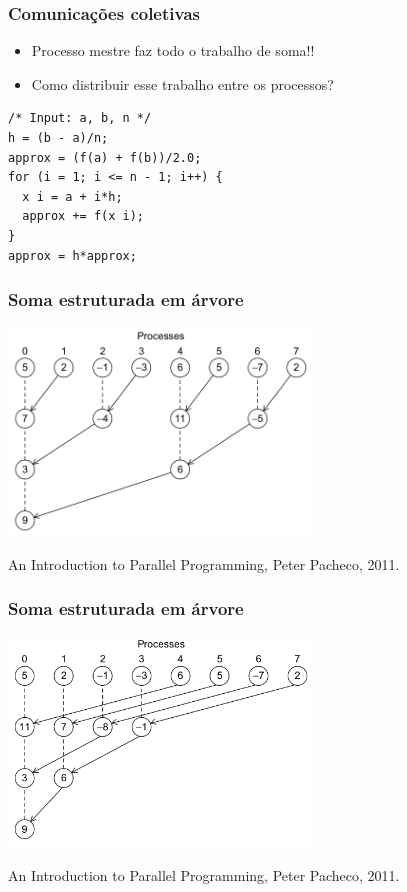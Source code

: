 \documentclass[xcolor={usenames,dvipsnames},12pt,presentation,aspectratio=169]{beamer}
\begin{document}
\begin{frame}[fragile]
  \frametitle{Comunicações coletivas}
  \begin{itemize}
    \item Processo mestre faz todo o trabalho de soma!!
    \item Como distribuir esse trabalho entre os processos?
  \end{itemize}
\begin{center}
\begin{minipage}{0.95\textwidth}
  \begin{verbatim}
/* Input: a, b, n */
h = (b - a)/n;
approx = (f(a) + f(b))/2.0;
for (i = 1; i <= n - 1; i++) {
  x i = a + i*h;
  approx += f(x i);
}
approx = h*approx;
  \end{verbatim}
\end{minipage}
\end{center}
\end{frame}
\begin{frame}
  \frametitle{Soma estruturada em árvore}
  \vspace{-3mm}
  \begin{center}
	\includegraphics[width=0.6\textwidth]{col1.png}
  \end{center}
  \vspace{-4mm}
  {\tiny An Introduction to Parallel Programming, Peter Pacheco, 2011.}
\end{frame}
\begin{frame}
  \frametitle{Soma estruturada em árvore}
  \vspace{-3mm}
  \begin{center}
	\includegraphics[width=0.6\textwidth]{col2.png}
  \end{center}
  \vspace{-4mm}
  {\tiny An Introduction to Parallel Programming, Peter Pacheco, 2011.}
\end{frame}
\end{document}
